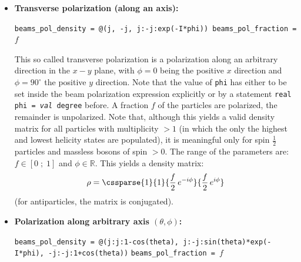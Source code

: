 \documentclass[12pt]{book}
\DeclareMathOperator{\diag}{diag}
\newcommand{\ttt}[1]{\texttt{#1}}
\begin{document}
{\begin{itemize}
\begin{center}
\begin{footnotesize}
    \ttt{beams\_pol\_density = @(0) \qquad beams\_pol\_fraction = $f$}
    \end{footnotesize}
  \end{center}
We consider massive particles with maximal spin component $j$, a
fraction $f$ of which having longitudinal polarization, the remainder
is unpolarized. Longitudinal polarization is (obviously) only
available for massive bosons of spin $>0$. Again, the parameter range
for the fraction is: $f \in \left[0\;;\;1\right]$. The density matrix
has the form:
\[ \rho = \diag\left(\frac{1-f}{|m|}\;,\;\dots\;,\;\frac{1-f}{|m|}\;,\;
\frac{1+f \left(|m| - 1\right)}{|m|}\;,\;\frac{1-f}{|m|}\;,
\;\dots\;,\;\frac{1-f}{|m|}\right)
\]
($|m| = 2j+1 $: particle multiplicity)
%
\item {\bf Transverse polarization (along an axis):}
  \begin{center}
    \begin{footnotesize}
    \ttt{beams\_pol\_density = @(j, -j, j:-j:exp(-I*phi)) \qquad
      beams\_pol\_fraction = $f$}
    \end{footnotesize}
  \end{center}
This so called transverse polarization is a polarization along an
arbitrary direction in the $x-y$ plane, with $\phi=0$ being the positive
$x$ direction and $\phi=90^\circ$ the positive $y$ direction. Note that
the value of \ttt{phi} has either to be set inside the beam
polarization expression explicitly or by a statement \ttt{real phi =
  {\em val} degree} before. A fraction $f$ of the particles are
polarized, the remainder is unpolarized. Note that, although
this yields a valid density matrix for all particles with multiplicity
$>1$ (in which the only the highest and lowest helicity states are
populated), it is meaningful only for spin $\frac{1}{2}$ particles and
massless bosons of spin $>0$. The range of the parameters are:
$f \in \left[0\;;\;1\right]$ and $\phi \in \mathbb{R}$. This yields a
density matrix:
\[ \rho =
\cssparse{1}{1}
   {\frac{f}{2}\,e^{-i\phi}} {\frac{f}{2}\,e^{i\phi}} \]
(for antiparticles, the matrix is conjugated).
%
\item {\bf Polarization along arbitrary axis $\left(\theta, \phi\right)$:}
  \begin{center}
    \begin{footnotesize}
    \ttt{beams\_pol\_density = @(j:j:1-cos(theta),
      j:-j:sin(theta)*exp(-I*phi), -j:-j:1+cos(theta))} \qquad\quad\qquad
    \ttt{beams\_pol\_fraction = $f$}
    \end{footnotesize}

\end{center}
\end{itemize}}
\end{document}

